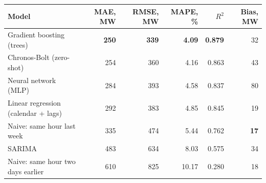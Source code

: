 \begin{tabular}{lrrrrr}
\toprule
Model & MAE, MW & RMSE, MW & MAPE, \% & $R^2$ & Bias, MW \\
\midrule
Gradient boosting (trees) & \textbf{250} & \textbf{339} & \textbf{4.09} & \textbf{0.879} & 32 \\
Chronos-Bolt (zero-shot) & 254 & 360 & 4.16 & 0.863 & 43 \\
Neural network (MLP) & 284 & 393 & 4.58 & 0.837 & 80 \\
Linear regression (calendar + lags) & 292 & 383 & 4.85 & 0.845 & 19 \\
Naive: same hour last week & 335 & 474 & 5.44 & 0.762 & \textbf{17} \\
SARIMA & 483 & 634 & 8.03 & 0.575 & 34 \\
Naive: same hour two days earlier & 610 & 825 & 10.17 & 0.280 & 18 \\
\bottomrule
\end{tabular}

